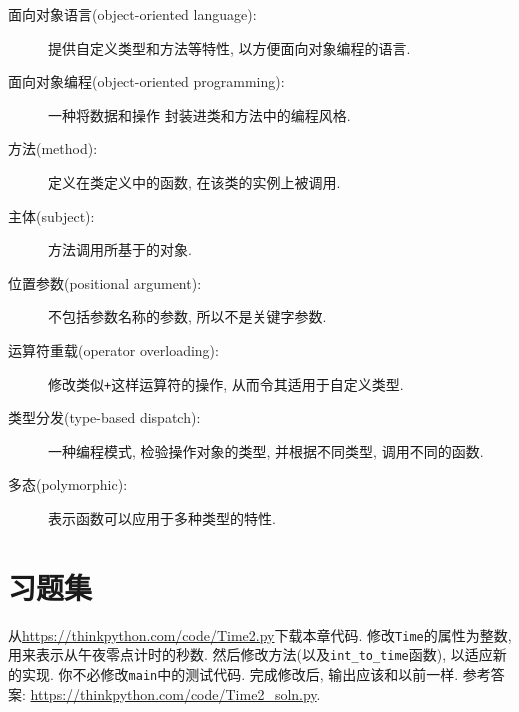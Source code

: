 \documentclass[10pt]{book}
\begin{document}
\begin{description}

\item[面向对象语言(object-oriented language):] 提供自定义类型和方法等特性, 
以方便面向对象编程的语言. 

\item[面向对象编程(object-oriented programming):] 
一种将数据和操作
封装进类和方法中的编程风格.

\item[方法(method):] 定义在类定义中的函数, 
在该类的实例上被调用. 

\item[主体(subject):] 方法调用所基于的对象. 

\item[位置参数(positional argument):] 不包括参数名称的参数, 
所以不是关键字参数. 

\item[运算符重载(operator overloading):] 修改类似{\tt +}这样运算符的操作, 
从而令其适用于自定义类型. 

\item[类型分发(type-based dispatch):] 一种编程模式, 检验操作对象的类型, 
并根据不同类型, 调用不同的函数. 

\item[多态(polymorphic):] 表示函数可以应用于多种类型的特性. 

\end{description}


\section{习题集}

\begin{exercise}

从\url{https://thinkpython.com/code/Time2.py}下载本章代码. 
修改{\tt Time}的属性为整数, 用来表示从午夜零点计时的秒数. 
然后修改方法(以及\verb"int_to_time"函数), 以适应新的实现. 
你不必修改{\tt main}中的测试代码. 
完成修改后, 输出应该和以前一样. 
参考答案: \url{https://thinkpython.com/code/Time2_soln.py}.

\end{exercise}
\end{document}
